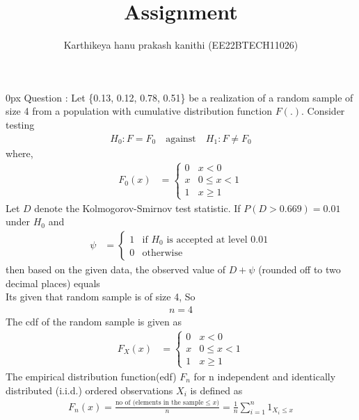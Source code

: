 \documentclass[article]{IEEEtran}
\theoremstyle{remark}
\begin{document}
\let\vec\mathbf


\title{
Assignment
}
\author{ Karthikeya hanu prakash kanithi (EE22BTECH11026)}
\maketitle
\parindent0px
\vspace{3cm}
Question : Let \{0.13, 0.12, 0.78, 0.51\} be a realization of a random sample of size 4 from a population with cumulative distribution function $F(.)$. Consider testing
\begin{align}
H_0 : F = F_0 \quad \text{against} \quad H_1 : F \ne F_0
\end{align}
where,
\begin{align}
    F_0(x) &= 
    \begin{cases}
        0 &  x<0  \\
        x & 0\le x<1 \\
        1 & x\ge 1
    \end{cases}
\end{align}
Let $D$ denote the Kolmogorov-Smirnov test statistic. If $P (D > 0.669) = 0.01$ under $H_0$ and
\begin{align}
    \psi &= 
    \begin{cases}
        1 &  \text{if } H_0 \text{ is accepted at level } 0.01 \\
        0 &  \text{otherwise} 
    \end{cases} 
\end{align}
then based on the given data, the observed value of $D + \psi$ (rounded off to two decimal places) equals
\\\solution 
Its given that random sample is of size 4, So 
\begin{align}
	n=4 \label{eq:st/65/1}
\end{align}
The cdf of the random sample is given as 
\begin{align}
    F_X(x) &= 
    \begin{cases}
        0 &  x<0  \\
        x & 0\le x<1 \\
        1 & x\ge 1
    \end{cases} \label{eq:st/65/2}
\end{align}
The empirical distribution function(edf) $F_n$ for n independent and identically distributed (i.i.d.) ordered observations $X_i$ is defined as
\begin{align}
	F_n(x) = \frac{\text{no of (elements in the sample} \le x)}{n} = \frac{1}{n} \sum_{i=1}^{n} 1_{X_i \le x}  \label{eq:st/65/3}
\end{align}
\end{document}
